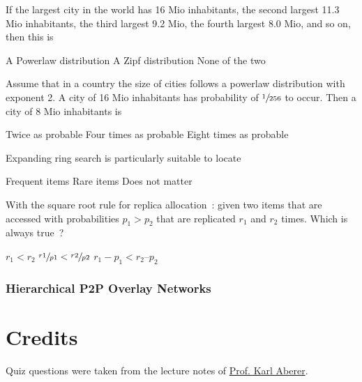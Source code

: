 \documentclass[12pt,a4paper,answers]{exam} %
\begin{document}
\begin{flushleft}
\begin{multicols*}{2}
\begin{questions}
\question If the largest city in the world has 16 Mio inhabitants, the second largest 11.3 Mio inhabitants, the third largest 9.2 Mio, the fourth largest 8.0 Mio, and so on, then this is
\begin{checkboxes}
\choice A Powerlaw distribution
\choice A Zipf distribution
\choice None of the two
\end{checkboxes}

\question Assume that in a country the size of cities follows a powerlaw distribution with exponent 2. A city of 16 Mio inhabitants has probability of $\sfrac{1}{256}$ to occur. Then a city of 8 Mio inhabitants is
\begin{checkboxes}
\choice Twice as probable
\choice Four times as probable
\choice Eight times as probable
\end{checkboxes}

\question Expanding ring search is particularly suitable to locate
\begin{checkboxes}
\choice Frequent items
\choice Rare items
\choice Does not matter
\end{checkboxes}

\question With the square root rule for replica allocation~: given two items that are accessed with probabilities $p_1 > p_2$ that are replicated $r_1$ and $r_2$ times. Which is always true~?
\begin{checkboxes}
\choice $r_1 < r_2$
\choice $\sfrac{r1}{p1} < \sfrac{r2}{p2}$
\choice $r_1 - p_1 < r_2 – p_2$
\end{checkboxes}


\subsubsection{Hierarchical P2P Overlay Networks}



\end{questions}
\section*{Credits}
Quiz questions were taken from the lecture notes of \href{http://people.epfl.ch/karl.aberer}{Prof. Karl Aberer}.%

%

\end{multicols*}
\end{flushleft}
\end{document}
